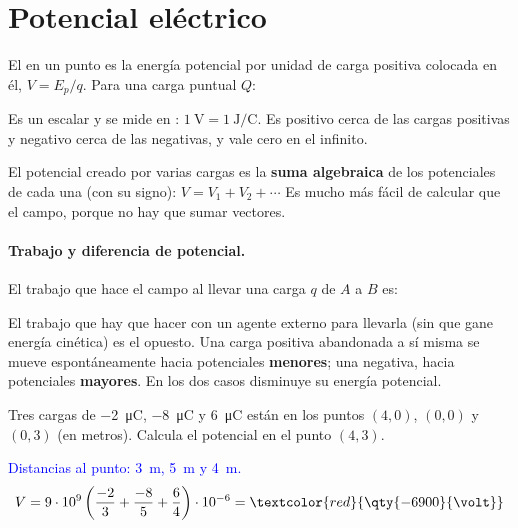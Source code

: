 \section{Potencial eléctrico}\label{sec:ele-potencial}

\begin{definition}
    El  en un punto es la energía potencial por unidad de carga positiva colocada en él,
    \(V = E_p/q\). Para una carga puntual \(Q\):
    \begin{centeredequation}
         \label{eq:ele-V}
    \end{centeredequation}
    Es un escalar y se mide en : \(\qty{1}{\volt} = \qty{1}{\joule\per\coulomb}\). Es positivo cerca de las cargas
    positivas y negativo cerca de las negativas, y vale cero en el infinito.
\end{definition}

El potencial creado por varias cargas es la \textbf{suma algebraica} de los potenciales de cada una (con su signo):
\(V = V_1 + V_2 + \cdots\) Es mucho más fácil de calcular que el campo, porque no hay que sumar vectores.

\paragraph{Trabajo y diferencia de potencial.} El trabajo que hace el campo al llevar una carga \(q\) de \(A\) a \(B\) es:
\begin{centeredequation}
     \label{eq:ele-trabajo}
\end{centeredequation}
El trabajo que hay que hacer con un agente externo para llevarla (sin que gane energía cinética) es el opuesto. Una carga
positiva abandonada a sí misma se mueve espontáneamente hacia potenciales \textbf{menores}; una negativa, hacia potenciales
\textbf{mayores}. En los dos casos disminuye su energía potencial.

\begin{exercise}
    Tres cargas de \qty{-2}{\micro\coulomb}, \qty{-8}{\micro\coulomb} y \qty{6}{\micro\coulomb} están en los puntos \((4, 0)\),
    \((0, 0)\) y \((0, 3)\) (en metros). Calcula el potencial en el punto \((4, 3)\).
    \begin{solu}
        \textcolor{blue}{Distancias al punto: \qty{3}{\m}, \qty{5}{\m} y \qty{4}{\m}.}
        \[ V = 9\cdot 10^9\left(\dfrac{-2}{3} + \dfrac{-8}{5} + \dfrac{6}{4}\right)\cdot 10^{-6} = \textcolor{red}{\qty{-6900}{\volt}} \]
    \end{solu}
\end{exercise}

